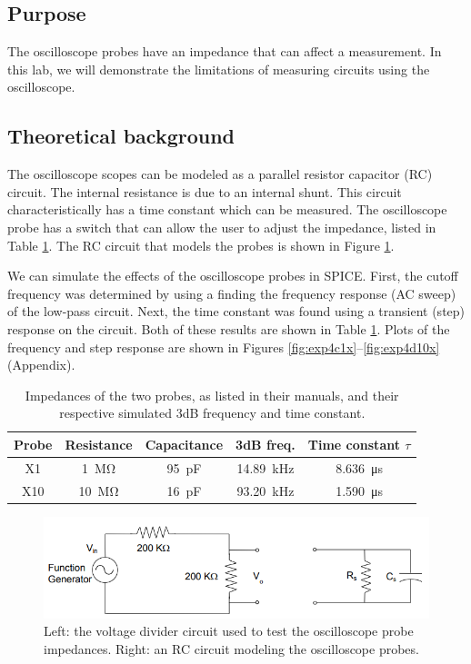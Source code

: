 \documentclass{report}
\begin{document}
\subsection{Purpose}
The oscilloscope probes have an impedance that can affect a measurement. In this lab, we will demonstrate the limitations of measuring circuits using the oscilloscope.

\subsection{Theoretical background}
The oscilloscope scopes can be modeled as a parallel resistor capacitor (RC) circuit. The internal resistance is due to an internal shunt. This circuit characteristically has a time constant which can be measured. The oscilloscope probe has a switch that can allow the user to adjust the impedance, listed in Table \ref{table:probes}. The RC circuit that models the probes is shown in Figure \ref{fig:rccircuit}.

We can simulate the effects of the oscilloscope probes in SPICE. First, the cutoff frequency was determined by using a finding the frequency response (AC sweep) of the low-pass circuit. Next, the time constant was found using a transient (step) response on the circuit. Both of these results are shown in Table \ref{table:probes}. Plots of the frequency and step response are shown in Figures \ref{fig:exp4c1x}--\ref{fig:exp4d10x} (Appendix).

\begin{table}[h]
	\centering
	\caption{Impedances of the two probes, as listed in their manuals, and their respective simulated 3dB frequency and time constant.}
	\begin{threeparttable}
		\label{table:probes}
		\begin{tabular}{c|cc|cc}
			\toprule
			Probe & Resistance & Capacitance & 3dB freq. & Time constant $\tau$\\
			\midrule
			X1 & \SI{1}{\mega\ohm} & \SI{95}{\pF} & \SI{14.89}{\kHz} & \SI{8.636}{\us} \\
			X10 & \SI{10}{\mega\ohm} & \SI{16}{\pF} & \SI{93.20}{\kHz} & \SI{1.590}{\us} \\
			\bottomrule
		\end{tabular}
	\end{threeparttable}
\end{table}

\begin{figure}[h]
	\centering
	\includegraphics[width=0.7\linewidth]{rccircuit}
	\caption{Left: the voltage divider circuit used to test the oscilloscope probe impedances. Right: an RC circuit modeling the oscilloscope probes.}
	\label{fig:rccircuit}
\end{figure}
\end{document}
